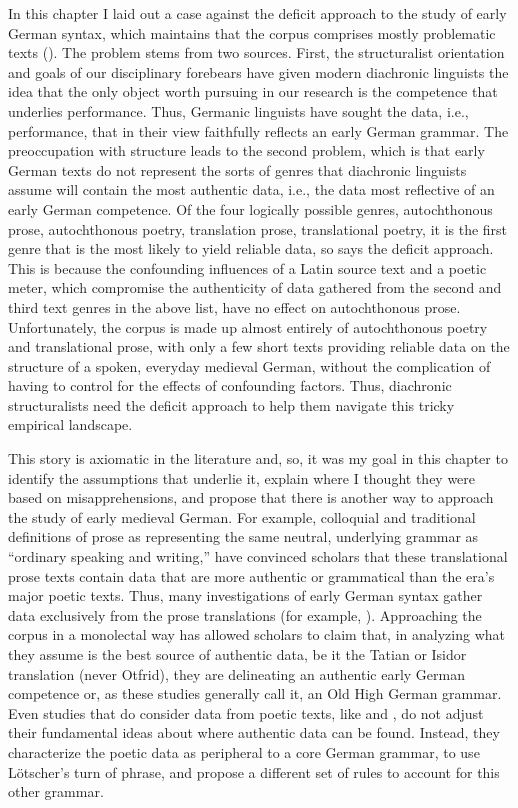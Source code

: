 In this chapter I laid out a case against the deficit approach to the study of early German syntax, which maintains that the corpus comprises mostly problematic texts (\citealt{Fleischer2006, Schrodt2004}). The problem stems from two sources. First, the structuralist orientation and goals of our disciplinary forebears have given modern diachronic linguists the idea that the only object worth pursuing in our research is the competence that underlies performance. Thus, Germanic linguists have sought the data, i.e., performance, that in their view faithfully reflects an early German grammar. The preoccupation with structure leads to the second problem, which is that early German texts do not represent the sorts of genres that diachronic linguists assume will contain the most authentic data, i.e., the data most reflective of an early German competence. Of the four logically possible genres, autochthonous prose, autochthonous poetry, translation prose, translational poetry, it is the first genre that is the most likely to yield reliable data, so says the deficit approach. This is because the confounding influences of a Latin source text and a poetic meter, which compromise the authenticity of data gathered from the second and third text genres in the above list, have no effect on autochthonous prose. Unfortunately, the corpus is made up almost entirely of autochthonous poetry and translational prose, with only a few short texts providing reliable data on the structure of a spoken, everyday medieval German, without the complication of having to control for the effects of confounding factors. Thus, diachronic structuralists need the deficit approach to help them navigate this tricky empirical landscape.

This story is axiomatic in the literature and, so, it was my goal in this chapter to identify the assumptions that underlie it, explain where I thought they were based on misapprehensions, and propose that there is another way to approach the study of early medieval German. For example, colloquial and traditional definitions of prose as representing the same neutral, underlying grammar as “ordinary speaking and writing,” have convinced scholars that these translational prose texts contain data that are more authentic or grammatical than the era’s major poetic texts. Thus, many investigations of early German syntax gather data exclusively from the prose translations (for example, \citealt{Axel2007, Robinson1997, PetrovaSolf2009, Schlachter2012}). Approaching the corpus in a monolectal way has allowed scholars to claim that, in analyzing what they assume is the best source of authentic data, be it the Tatian or Isidor translation (never Otfrid), they are delineating an authentic early German competence or, as these studies generally call it, an Old High German grammar. Even studies that do consider data from poetic texts, like \citet{Lötscher2009} and \citet{Lenerz1985}, do not adjust their fundamental ideas about where authentic data can be found. Instead, they characterize the poetic data as peripheral to a core German grammar, to use Lötscher’s turn of phrase, and propose a different set of rules to account for this other grammar.

